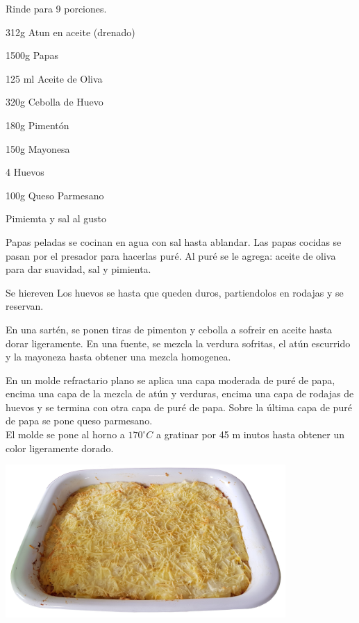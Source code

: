 
Rinde para 9 porciones.\\

\begin{ingredientes}
\item 312g Atun en aceite (drenado)
\item 1500g Papas
\item 125 ml Aceite de Oliva
\item 320g Cebolla de Huevo
\item 180g Pimentón
\item 150g Mayonesa
\item 4 Huevos
\item 100g Queso Parmesano
\item Pimiemta y sal al gusto
\end{ingredientes}
\preparacion

Papas peladas se cocinan en agua con sal hasta ablandar. Las papas cocidas se pasan por el presador para hacerlas puré. Al puré se le agrega: aceite de oliva para dar suavidad, sal y pimienta.

Se hiereven Los huevos se hasta que queden duros, partiendolos en rodajas y se reservan.

En una sartén, se ponen tiras de pimenton y cebolla a sofreir en aceite hasta dorar ligeramente. En una fuente, se mezcla la verdura sofritas, el atún escurrido y la mayoneza hasta obtener una mezcla homogenea. 

En un molde refractario plano se aplica una capa moderada de puré de papa, encima una capa de la mezcla de atún y verduras, encima una capa de rodajas de huevos y se termina con otra capa de puré de papa. Sobre la última capa de puré de papa se pone queso parmesano.\\

El molde se pone al horno a $170^{\circ}C$  a gratinar por 45 m inutos hasta obtener un color ligeramente dorado.\\

\vspace*{2cm}
\begin{center}
\includegraphics[width=0.8\textwidth]{fotos/molde_atun_2.jpeg}
\end{center}

